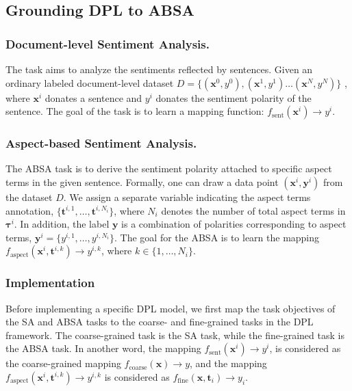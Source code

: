 \documentclass[11pt]{article}
\newcommand{\bx}{\mathbf{x}}
\newcommand{\bt}{\mathbf{t}}
\newcommand{\by}{\mathbf{y}}
\newcommand{\btau}{\boldsymbol{\tau}}
\begin{document}
\subsection{Grounding DPL to ABSA}



\subsubsection{Document-level Sentiment Analysis.}
The task aims to analyze the sentiments reflected by sentences.
Given an ordinary labeled document-level dataset $D = \{(\bx^0, y^0), (\bx^1, y^1) \dots (\bx^N, y^N)\}$ , where $\bx^i$ donates a sentence and $y^i$ donates the sentiment polarity of the sentence.
The goal of the task is to learn a mapping function: $f_{\text{sent}}(\bx^i) \to y^i$.

\subsubsection{Aspect-based Sentiment Analysis.}
The ABSA task is to derive the sentiment polarity attached to specific aspect terms in the given sentence.
Formally, one can draw a data point $(\bx^i, \by^i)$ from the dataset $D$. We assign a separate variable indicating the aspect terms annotation, $\{\bt^{i, 1}, \dots, \bt^{i, N_{i}}\}$, where $N_{i}$ denotes the number of total aspect terms in $\btau^i$.
In addition, the label $\by$ is a combination of polarities corresponding to aspect terms, $\by^i = \{y^{i, 1}, \dots, y^{i, N_{i}}\}$.
The goal for the ABSA is to learn the mapping $f_{\text{aspect}}(\bx^i, \bt^{i,k}) \to y^{i,k}$, where $k \in \{1,\dots, N_i\}$.


\subsubsection{Implementation}
Before implementing a specific DPL model, we first map the task objectives of the SA and ABSA tasks to the coarse- and fine-grained tasks in the DPL framework.
The coarse-grained task is the SA task, while the fine-grained task is the ABSA task.
In another word, the mapping $f_{\text{sent}}(\bx^i) \to y^i$, is considered as the coarse-grained mapping  $f_{\text{coarse}}(\bx) \to y$, and the mapping $f_{\text{aspect}}(\bx^i, \bt^{i,k}) \to y^{i,k}$ is considered as $f_{\text{fine}}(\bx, \bt_i) \to y_i$.
\end{document}

